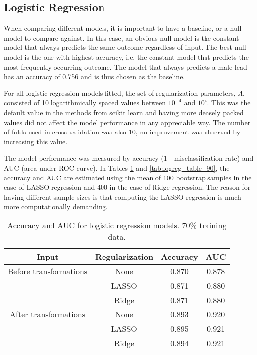\documentclass{article}
\begin{document}
\subsection{Logistic Regression}

When comparing different models, it is important to have a baseline, or a null model to compare against. In this case, an obvious null model is the constant model that always predicts the same outcome regardless of input. The best null model is the one with highest accuracy, i.e. the constant model that predicts the most frequently occurring outcome. The model that always predicts a male lead has an accuracy of 0.756 and is thus chosen as the baseline.

For all logistic regression models fitted, the set of regularization parameters, $\Lambda$, consisted of 10 logarithmically spaced values between $10^{-4}$ and $10^4$. This was the default value in the methods from scikit learn and having more densely packed values did not affect the model performance in any appreciable way. The number of folds used in cross-validation was also 10, no improvement was observed by increasing this value.

The model performance was measured by accuracy (1 - misclassification rate) and AUC (area under ROC curve). In Tables \ref{tab:logreg_table_70} and \ref{tab:logreg_table_90}, the accuracy and AUC are estimated using the mean of 100 bootstrap samples in the case of LASSO regression and 400 in the case of Ridge regression. The reason for having different sample sizes is that computing the LASSO regression is much more computationally demanding.

\begin{table}[h!]
	\centering
	\begin{tabular}{cccc}
		Input & Regularization & Accuracy & AUC \\
		\midrule
		Before transformations & None & 0.870 & 0.878 \\
	    & LASSO & 0.871 & 0.880 \\
		& Ridge & 0.871 & 0.880 \\
		\midrule
		After transformations & None & 0.893 & 0.920 \\
		& LASSO & 0.895 & 0.921 \\
		& Ridge & 0.894 & 0.921 \\
	\end{tabular}
	\caption{Accuracy and AUC for logistic regression models. 70\% training data.}
	\label{tab:logreg_table_70}
\end{table}
\end{document}
